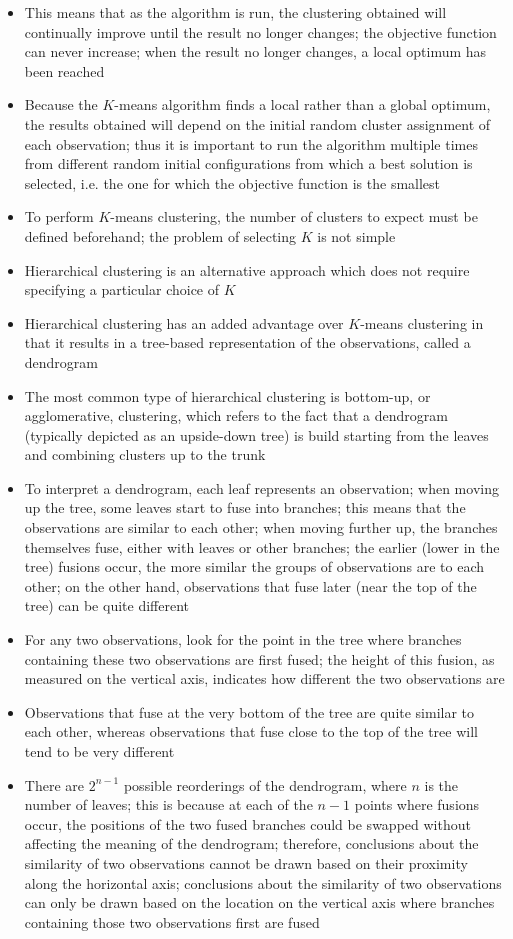\documentclass[12pt]{article}
\begin{document}
\begin{itemize}
\item This means that as the algorithm is run, the clustering obtained will continually improve until the result no longer changes; the objective function can never increase; when the result no longer changes, a local optimum has been reached 
\item Because the $K$-means algorithm finds a local rather than a global optimum, the results obtained will depend on the initial random cluster assignment of each observation; thus it is important to run the algorithm multiple times from different random initial configurations from which a best solution is selected, i.e. the one for which the objective function is the smallest 
\item To perform $K$-means clustering, the number of clusters to expect must be defined beforehand; the problem of selecting $K$ is not simple
\item Hierarchical clustering is an alternative approach which does not require specifying a particular choice of $K$
\item Hierarchical clustering has an added advantage over $K$-means clustering in that it results in a tree-based representation of the observations, called a dendrogram
\item The most common type of hierarchical clustering is bottom-up, or agglomerative, clustering, which refers to the fact that a dendrogram (typically depicted as an upside-down tree) is build starting from the leaves and combining clusters up to the trunk 
\item To interpret a dendrogram, each leaf represents an observation; when moving up the tree, some leaves start to fuse into branches; this means that the observations are similar to each other; when moving further up, the branches themselves fuse, either with leaves or other branches; the earlier (lower in the tree) fusions occur, the more similar the groups of observations are to each other; on the other hand, observations that fuse later (near the top of the tree) can be quite different 
\item For any two observations, look for the point in the tree where branches containing these two observations are first fused; the height of this fusion, as measured on the vertical axis, indicates how different the two observations are 
\item Observations that fuse at the very bottom of the tree are quite similar to each other, whereas observations that fuse close to the top of the tree will tend to be very different 
\item There are $2^{n-1}$ possible reorderings of the dendrogram, where $n$ is the number of leaves; this is because at each of the $n-1$ points where fusions occur, the positions of the two fused branches could be swapped without affecting the meaning of the dendrogram; therefore, conclusions about the similarity of two observations cannot be drawn based on their proximity along the horizontal axis; conclusions about the similarity of two observations can only be drawn based on the location on the vertical axis where branches containing those two observations first are fused 

\end{itemize}
\end{document}
